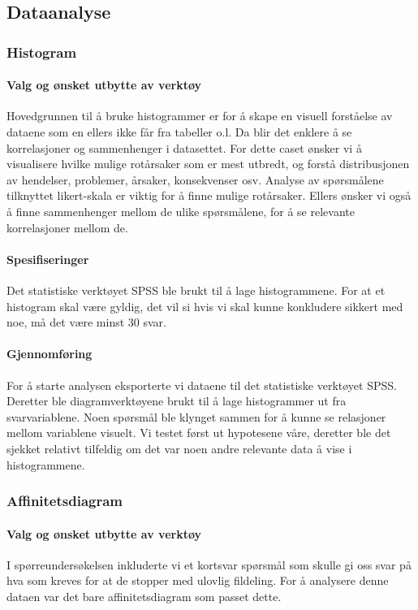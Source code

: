 \subsection{Dataanalyse}

\subsubsection{Histogram}

\paragraph{Valg og ønsket utbytte av verktøy}
Hovedgrunnen til å bruke histogrammer er for å skape en visuell forståelse av dataene som en ellers ikke får fra tabeller o.l. Da blir det enklere å se korrelasjoner og sammenhenger i datasettet. For dette caset ønsker vi å visualisere hvilke mulige rotårsaker som er mest utbredt, og forstå distribusjonen av hendelser, problemer, årsaker, konsekvenser osv. Analyse av spørsmålene tilknyttet likert-skala er viktig for å finne mulige rotårsaker. Ellers ønsker vi også å finne sammenhenger mellom de ulike spørsmålene, for å se relevante korrelasjoner mellom de.

\paragraph{Spesifiseringer}
Det statistiske verktøyet SPSS ble brukt til å lage histogrammene. For at et histogram skal være gyldig, det vil si hvis vi skal kunne konkludere sikkert med noe, må det være minst 30 svar. 

\paragraph{Gjennomføring}
For å starte analysen eksporterte vi dataene til det statistiske verktøyet SPSS. Deretter ble diagramverktøyene brukt til å lage histogrammer ut fra svarvariablene. Noen spørsmål ble klynget sammen for å kunne se relasjoner mellom variablene visuelt. Vi testet først ut hypotesene våre, deretter ble det sjekket relativt tilfeldig om det var noen andre relevante data å vise i histogrammene. 


\subsubsection{Affinitetsdiagram}

\paragraph{Valg og ønsket utbytte av verktøy}
I spørreundersøkelsen inkluderte vi et kortsvar spørsmål som skulle gi oss svar på hva som kreves for at de stopper med ulovlig fildeling. For å analysere denne dataen var det bare affinitetsdiagram som passet dette. 

